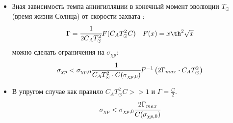 \begin{itemize}
	\item Зная зависимость темпа аннигилляции в конечный момент эволюции $T_{\odot}$ (время жизни Солнца) от скорости захвата :
	 \begin{equation*}
	 	\Gamma =  \cfrac{1}{2 C_A T_{\odot}^2} F(C_A T_{\odot}^2 C) \quad F(x) = x\th^2{\sqrt{x}}
	 \end{equation*}
	 можно сделать ограничения на $\sigma_{\chi p}$:
	 \begin{equation*}
	 	\sigma_{\chi p} < \sigma_{\chi p, 0} \cfrac{1}{C_A T_{\odot}^2 \cdot C(\sigma_{\chi p,0})} F^{-1}\left(	2\Gamma_{max} \cdot C_A T_{\odot}^2\right)
	 \end{equation*}
	\item  В упругом случае как правило $C_AT_{\odot}^2 C >> 1$ и $\Gamma = \frac{C}{2}$.
	\begin{equation*}
		\sigma_{\chi p} < \sigma_{\chi p, 0} \cfrac{2\Gamma_{max}}{C(\sigma_{\chi p,0})} 
	\end{equation*}
\end{itemize}